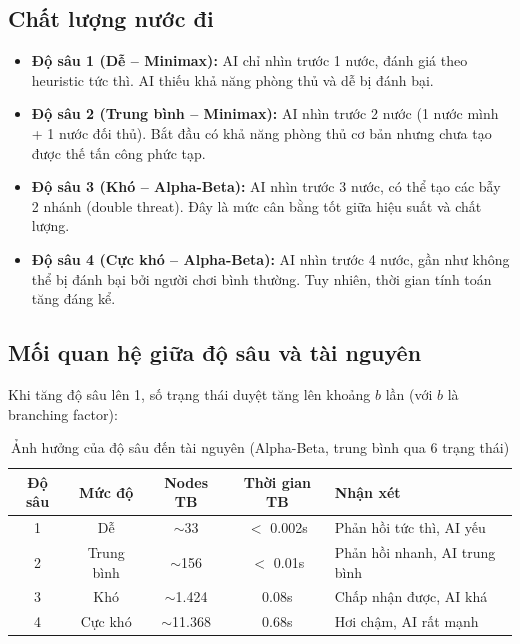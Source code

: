 \documentclass[12pt,a4paper]{article}
\begin{document}
\subsection{Chất lượng nước đi}

\begin{itemize}
    \item \textbf{Độ sâu 1 (Dễ -- Minimax):} AI chỉ nhìn trước 1 nước, đánh giá theo heuristic tức thì. AI thiếu khả năng phòng thủ và dễ bị đánh bại.

    \item \textbf{Độ sâu 2 (Trung bình -- Minimax):} AI nhìn trước 2 nước (1 nước mình + 1 nước đối thủ). Bắt đầu có khả năng phòng thủ cơ bản nhưng chưa tạo được thế tấn công phức tạp.

    \item \textbf{Độ sâu 3 (Khó -- Alpha-Beta):} AI nhìn trước 3 nước, có thể tạo các bẫy 2 nhánh (double threat). Đây là mức cân bằng tốt giữa hiệu suất và chất lượng.

    \item \textbf{Độ sâu 4 (Cực khó -- Alpha-Beta):} AI nhìn trước 4 nước, gần như không thể bị đánh bại bởi người chơi bình thường. Tuy nhiên, thời gian tính toán tăng đáng kể.
\end{itemize}

\subsection{Mối quan hệ giữa độ sâu và tài nguyên}

Khi tăng độ sâu lên 1, số trạng thái duyệt tăng lên khoảng $b$ lần (với $b$ là branching factor):

\begin{table}[H]
\centering
\caption{Ảnh hưởng của độ sâu đến tài nguyên (Alpha-Beta, trung bình qua 6 trạng thái)}
\begin{tabular}{ccccl}
\toprule
\textbf{Độ sâu} & \textbf{Mức độ} & \textbf{Nodes TB} & \textbf{Thời gian TB} & \textbf{Nhận xét} \\
\midrule
1 & Dễ       & $\sim$33   & $<$ 0.002s & Phản hồi tức thì, AI yếu \\
2 & Trung bình & $\sim$156 & $<$ 0.01s  & Phản hồi nhanh, AI trung bình \\
3 & Khó      & $\sim$1.424 & 0.08s     & Chấp nhận được, AI khá \\
4 & Cực khó  & $\sim$11.368 & 0.68s    & Hơi chậm, AI rất mạnh \\
\bottomrule
\end{tabular}
\end{table}
\end{document}
